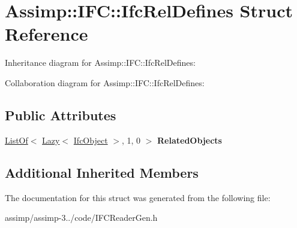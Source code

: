 \hypertarget{struct_assimp_1_1_i_f_c_1_1_ifc_rel_defines}{\section{Assimp\+:\+:I\+F\+C\+:\+:Ifc\+Rel\+Defines Struct Reference}
\label{struct_assimp_1_1_i_f_c_1_1_ifc_rel_defines}
}


Inheritance diagram for Assimp\+:\+:I\+F\+C\+:\+:Ifc\+Rel\+Defines\+:


Collaboration diagram for Assimp\+:\+:I\+F\+C\+:\+:Ifc\+Rel\+Defines\+:
\subsection*{Public Attributes}
\begin{DoxyCompactItemize}
\item 
\hypertarget{struct_assimp_1_1_i_f_c_1_1_ifc_rel_defines_a7ac4d54ca06aadad1a01fe3b1f0768ff}{\hyperlink{struct_assimp_1_1_s_t_e_p_1_1_list_of}{List\+Of}$<$ \hyperlink{struct_assimp_1_1_s_t_e_p_1_1_lazy}{Lazy}$<$ \hyperlink{struct_assimp_1_1_i_f_c_1_1_ifc_object}{Ifc\+Object} $>$, 1, 0 $>$ {\bfseries Related\+Objects}}\label{struct_assimp_1_1_i_f_c_1_1_ifc_rel_defines_a7ac4d54ca06aadad1a01fe3b1f0768ff}

\end{DoxyCompactItemize}
\subsection*{Additional Inherited Members}


The documentation for this struct was generated from the following file\+:\begin{DoxyCompactItemize}
\item 
assimp/assimp-\/3../code/I\+F\+C\+Reader\+Gen.\+h\end{DoxyCompactItemize}
